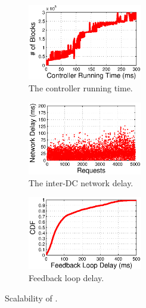 \begin{figure}[t]
        \centering
        \begin{subfigure}[b]{0.3\textwidth}
                \centering
                \includegraphics[width=50mm]{images/CPUvsBlk.eps}%
                \caption{The controller running time.}
                \label{fig:scale:cpu}
        \end{subfigure}
        \begin{subfigure}[b]{0.3\textwidth}
                \centering
                \includegraphics[width=50mm]{images/NetworkDelay.eps}%
                \caption{The inter-DC network delay.}
                \label{fig:scale:network}
        \end{subfigure}
        \begin{subfigure}[b]{0.3\textwidth}
                \centering
                \includegraphics[width=50mm]{images/CDFofFeedbackLoopDelay.eps}
                \caption{Feedback loop delay.}
                \label{fig:scale:feedback}
        \end{subfigure}
        \caption{Scalability of \name.}
        \label{fig:scale}
\vspace{-0.4cm}
\end{figure}

